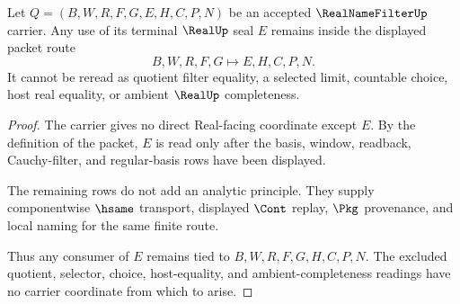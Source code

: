 \begin{theorem}
\label{thm:real-name-filter-real-seal-nonescape}
Let $Q=(B,W,R,F,G,E,H,C,P,N)$ be an accepted $\RealNameFilterUp$ carrier. Any use of its terminal $\RealUp$ seal $E$ remains inside the displayed packet route
$$
B,W,R,F,G \longmapsto E,H,C,P,N .
$$
It cannot be reread as quotient filter equality, a selected limit, countable choice, host real equality, or ambient $\RealUp$ completeness.
\end{theorem}
\begin{proof}
The carrier gives no direct Real-facing coordinate except $E$. By the definition of the packet, $E$ is read only after the basis, window, readback, Cauchy-filter, and regular-basis rows have been displayed.

The remaining rows do not add an analytic principle. They supply componentwise $\hsame$ transport, displayed $\Cont$ replay, $\Pkg$ provenance, and local naming for the same finite route.

Thus any consumer of $E$ remains tied to $B,W,R,F,G,H,C,P,N$. The excluded quotient, selector, choice, host-equality, and ambient-completeness readings have no carrier coordinate from which to arise.
\end{proof}




